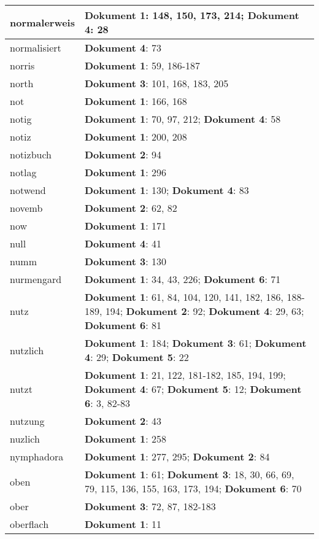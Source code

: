 \documentclass[a5paper]{article}
\begin{document}
\begin{longtable}[l]{|l|p{3in}|}
\hline
normalerweis & \textbf{Dokument 1}: 148, 150, 173, 214; \textbf{Dokument 4}: 28 \\
\hline
normalisiert & \textbf{Dokument 4}: 73 \\
\hline
norris & \textbf{Dokument 1}: 59, 186-187 \\
\hline
north & \textbf{Dokument 3}: 101, 168, 183, 205 \\
\hline
not & \textbf{Dokument 1}: 166, 168 \\
\hline
notig & \textbf{Dokument 1}: 70, 97, 212; \textbf{Dokument 4}: 58 \\
\hline
notiz & \textbf{Dokument 1}: 200, 208 \\
\hline
notizbuch & \textbf{Dokument 2}: 94 \\
\hline
notlag & \textbf{Dokument 1}: 296 \\
\hline
notwend & \textbf{Dokument 1}: 130; \textbf{Dokument 4}: 83 \\
\hline
novemb & \textbf{Dokument 2}: 62, 82 \\
\hline
now & \textbf{Dokument 1}: 171 \\
\hline
null & \textbf{Dokument 4}: 41 \\
\hline
numm & \textbf{Dokument 3}: 130 \\
\hline
nurmengard & \textbf{Dokument 1}: 34, 43, 226; \textbf{Dokument 6}: 71 \\
\hline
nutz & \textbf{Dokument 1}: 61, 84, 104, 120, 141, 182, 186, 188-189, 194; \textbf{Dokument 2}: 92; \textbf{Dokument 4}: 29, 63; \textbf{Dokument 6}: 81 \\
\hline
nutzlich & \textbf{Dokument 1}: 184; \textbf{Dokument 3}: 61; \textbf{Dokument 4}: 29; \textbf{Dokument 5}: 22 \\
\hline
nutzt & \textbf{Dokument 1}: 21, 122, 181-182, 185, 194, 199; \textbf{Dokument 4}: 67; \textbf{Dokument 5}: 12; \textbf{Dokument 6}: 3, 82-83 \\
\hline
nutzung & \textbf{Dokument 2}: 43 \\
\hline
nuzlich & \textbf{Dokument 1}: 258 \\
\hline
nymphadora & \textbf{Dokument 1}: 277, 295; \textbf{Dokument 2}: 84 \\
\hline
oben & \textbf{Dokument 1}: 61; \textbf{Dokument 3}: 18, 30, 66, 69, 79, 115, 136, 155, 163, 173, 194; \textbf{Dokument 6}: 70 \\
\hline
ober & \textbf{Dokument 3}: 72, 87, 182-183 \\
\hline
oberflach & \textbf{Dokument 1}: 11 \\

\end{longtable}
\end{document}
